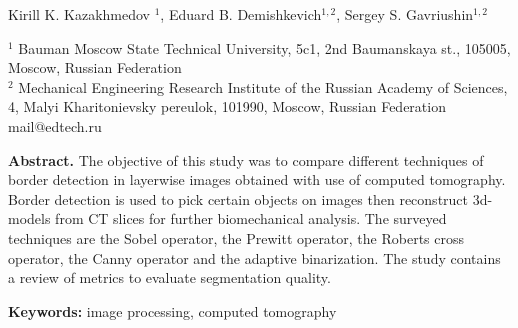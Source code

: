 \thispagestyle{empty}
{}

\vspace{5mm}

\begin{center} Kirill K. Kazakhmedov $^{1}$, Eduard B. Demishkevich$^{1,2}$, Sergey S. Gavriushin$^{1,2}$  \\

\vspace{5mm}

{\small $^{1}$ Bauman Moscow State Technical University, 5c1, 2nd Baumanskaya st., 105005, Moscow, Russian Federation \\
$^{2}$ Mechanical Engineering Research Institute of the Russian Academy of Sciences, 4, Malyi Kharitonievsky pereulok, 101990, Moscow, Russian Federation \\
mail@edtech.ru }
\end{center}

\begin{changemargin}{0.5cm}{0.5cm}
{\small \textbf{Abstract.} The objective of this study was to compare different techniques of border detection in layerwise images obtained with use of 
computed tomography. Border detection is used to pick certain objects on images then reconstruct 3d-models from CT slices for further biomechanical analysis.
The surveyed techniques are the Sobel operator, the Prewitt operator, the Roberts cross operator, the Canny operator and the adaptive binarization. 
The study contains a review of metrics to evaluate segmentation quality.}

{\small \textbf{Keywords:} image processing, computed tomography}

\end{changemargin}







